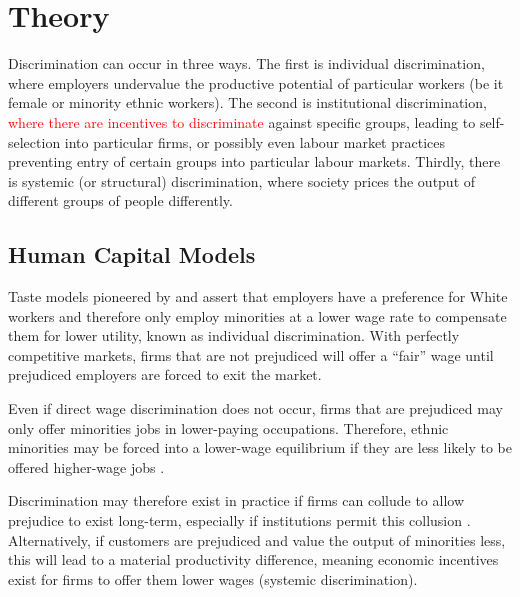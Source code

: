 \documentclass[class=article, crop=false]{standalone}
\begin{document}
\section{Theory}
\label{sec:Theory}
Discrimination can occur in three ways. The first is individual discrimination, where employers undervalue the productive potential of particular workers (be it female or minority ethnic workers). The second is institutional discrimination, \textcolor{red}{where there are incentives to discriminate} against specific groups, leading to self-selection into particular firms, or possibly even labour market practices preventing entry of certain groups into particular labour markets. Thirdly, there is systemic (or structural) discrimination, where society prices the output of different groups of people differently.

\subsection{Human Capital Models}
\label{sec:Human Capital Models}
Taste models pioneered by \citet{Becker} and \citet{Arrow} assert that employers have a preference for White workers and therefore only employ minorities at a lower wage rate to compensate them for lower utility, known as individual discrimination. With perfectly competitive markets, firms that are not prejudiced will offer a \enquote{fair} wage until prejudiced employers are forced to exit the market.

Even if direct wage discrimination does not occur, firms that are prejudiced may only offer minorities jobs in lower-paying occupations. Therefore, ethnic minorities may be forced into a lower-wage equilibrium if they are less likely to be offered higher-wage jobs \citep{Coate}.

Discrimination may therefore exist in practice if firms can collude to allow prejudice to exist long-term, especially if institutions permit this collusion \citep{LundbergB}. Alternatively, if customers are prejudiced and value the output of minorities less, this will lead to a material productivity difference, meaning economic incentives exist for firms to offer them lower wages (systemic discrimination).
\end{document}
